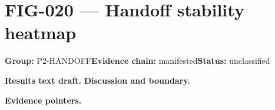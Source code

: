 \clearpage
\section{FIG-020 --- Handoff stability heatmap}
\label{figpage:fig-020}
\textbf{Group:} P2-HANDOFF\quad \textbf{Evidence chain:} manifested\quad \textbf{Status:} unclassified

\textbf{Results text draft.} 
\textbf{Discussion and boundary.} 


\textbf{Evidence pointers.}



\vfill
